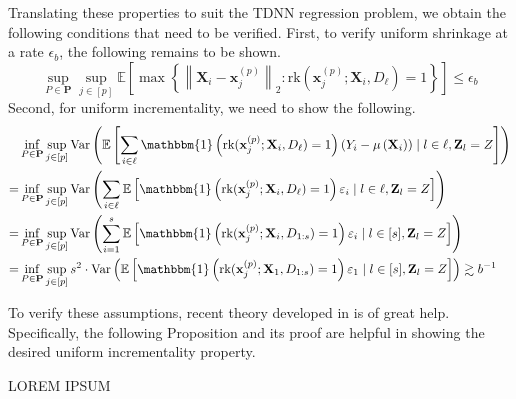 \documentclass[letterpaper,10pt]{article}
\numberwithin{equation}{section}
\numberwithin{thm}{section}
\numberwithin{lem}{section}
\numberwithin{cor}{section}
\newcommand{\E}{\mathbb{E}}
\newcommand{\1}{\mathbbm{1}}
\newcommand{\Var}{\text{Var}}
\newcommand{\rk}{\text{rk}}
\begin{document}
Translating these properties to suit the TDNN regression problem, we obtain the following conditions that need to be verified.
First, to verify uniform shrinkage at a rate $\epsilon_b$, the following remains to be shown.
\begin{equation}
	\sup_{P \in \mathbf{P}} \sup_{j \in[p]}
	\E\left[\max \left\{\left\|\mathbf{X}_i-\mathbf{x}^{(p)}_{j}\right\|_{2}:
	\rk(\mathbf{x}^{(p)}_{j}; \mathbf{X}_i, D_{\ell}) = 1\right\}\right]
	\leq \epsilon_b
\end{equation}
Second, for uniform incrementality, we need to show the following.
\begin{equation}
	\begin{aligned}
		  & \inf_{P \in \mathbf{P}} \sup_{j \in[p]}
		\Var\left(\E\left[
				\sum_{i \in \ell} \1\left(\rk(\mathbf{x}^{(p)}_{j}; \mathbf{X}_i, D_{\ell}) = 1\right) \left(Y_i - \mu\left(\mathbf{X}_i\right)\right) \mid l \in \ell, \mathbf{Z}_l = Z\right]
		\right)                                     \\
		= & \inf_{P \in \mathbf{P}} \sup_{j \in[p]}
		\Var\left(
		\sum_{i \in \ell}\E\left[\1\left(\rk(\mathbf{x}^{(p)}_{j}; \mathbf{X}_i, D_{\ell}) = 1\right) \varepsilon_i \mid l \in \ell, \mathbf{Z}_l = Z\right]
		\right)                                     \\
		= & \inf_{P \in \mathbf{P}} \sup_{j \in[p]}
		\Var\left(
		\sum_{i = 1}^{s}\E\left[\1\left(\rk(\mathbf{x}^{(p)}_{j}; \mathbf{X}_i, D_{1:s}) = 1\right) \varepsilon_i \mid l \in [s], \mathbf{Z}_l = Z\right]
		\right)                                     \\
		= & \inf_{P \in \mathbf{P}} \sup_{j \in[p]}
		s^2 \cdot \Var\left(
		\E\left[\1\left(\rk(\mathbf{x}^{(p)}_{j}; \mathbf{X}_1, D_{1:s}) = 1\right) \varepsilon_1 \mid l \in [s], \mathbf{Z}_l = Z\right]
		\right)
		\gtrsim b^{-1}
	\end{aligned}
\end{equation}

To verify these assumptions, recent theory developed in \citet{peng_rates_2022} is of great help.
Specifically, the following Proposition and its proof are helpful in showing the desired uniform incrementality property.

	{\color{red} LOREM IPSUM}
\end{document}
